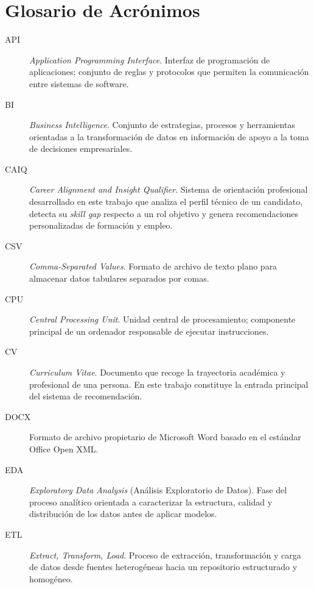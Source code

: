 \section*{Glosario de Acrónimos}

\begin{description}

  \item[API] \textit{Application Programming Interface}. Interfaz de programación de aplicaciones; conjunto de reglas y protocolos que permiten la comunicación entre sistemas de software.

  \item[BI] \textit{Business Intelligence}. Conjunto de estrategias, procesos y herramientas orientadas a la transformación de datos en información de apoyo a la toma de decisiones empresariales.

  \item[CAIQ] \textit{Career Alignment and Insight Qualifier}. Sistema de orientación profesional desarrollado en este trabajo que analiza el perfil técnico de un candidato, detecta su \textit{skill gap} respecto a un rol objetivo y genera recomendaciones personalizadas de formación y empleo.

  \item[CSV] \textit{Comma-Separated Values}. Formato de archivo de texto plano para almacenar datos tabulares separados por comas.

  \item[CPU] \textit{Central Processing Unit}. Unidad central de procesamiento; componente principal de un ordenador responsable de ejecutar instrucciones.

  \item[CV] \textit{Curriculum Vitae}. Documento que recoge la trayectoria académica y profesional de una persona. En este trabajo constituye la entrada principal del sistema de recomendación.

  \item[DOCX] Formato de archivo propietario de Microsoft Word basado en el estándar Office Open XML.

  \item[EDA] \textit{Exploratory Data Analysis} (Análisis Exploratorio de Datos). Fase del proceso analítico orientada a caracterizar la estructura, calidad y distribución de los datos antes de aplicar modelos.

  \item[ETL] \textit{Extract, Transform, Load}. Proceso de extracción, transformación y carga de datos desde fuentes heterogéneas hacia un repositorio estructurado y homogéneo.


\end{description}
